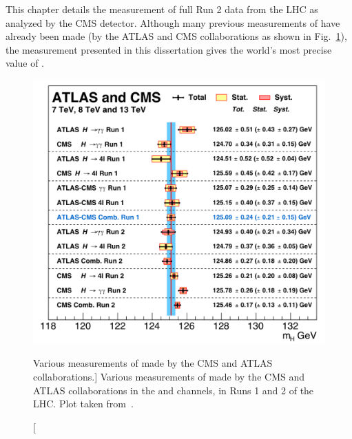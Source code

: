This chapter details the measurement of \mH full Run 2 data from the LHC as analyzed by the CMS detector.
Although many previous measurements of \mH have already been made (\eg by the ATLAS and CMS collaborations as shown in Fig.~\ref{fig:atlas_cms_mH_meas}), the measurement presented in this dissertation gives the world's most precise value of \mH.
\begin{figure}[hbtp]
    \centering
    \includegraphics[width=\textwidth,keepaspectratio]{figures/higgsmassmeas/all_mH_measurements_atlas_cms.png}
        \caption
        [Various measurements of \mH made by the CMS and ATLAS collaborations.]
        {
            Various measurements of \mH made by the CMS and ATLAS collaborations in the \htoyy and \hzzfourl channels, in Runs 1 and 2 of the LHC.
            Plot taken from~\cite{particle_data_group_review_2020}.
        }
        \label{fig:atlas_cms_mH_meas}
\end{figure}


